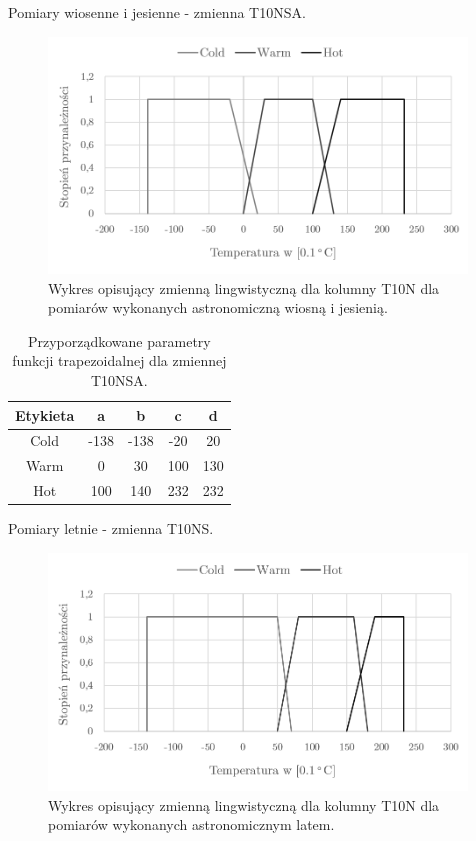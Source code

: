 \documentclass{classrep}
\begin{document}
Pomiary wiosenne i jesienne - zmienna T10NSA.
\begin{figure}[H]
	\centering
	\includegraphics[width=0.99\textwidth]{Pictures/TermsCharts/T10_WJ.png}
	\caption{Wykres opisujący zmienną lingwistyczną dla kolumny T10N dla pomiarów wykonanych astronomiczną wiosną i jesienią.}
\end{figure}

\begin{table}[H]
	\centering
	\begin{tabular}{c c c c c} 
		\hline
		\textbf{Etykieta} & \textbf{a} & \textbf{b} & \textbf{c} & \textbf{d}\\ [0.5ex] 
		\hline
		\hline 
Cold	 & -138 & -138 & -20 & 20 \\
Warm & 0 & 30 & 100 & 130 \\
Hot	 & 100 & 140 & 232 & 232 \\
		\hline
	\end{tabular}
	\caption{Przyporządkowane parametry funkcji trapezoidalnej dla zmiennej T10NSA.}
\end{table}

Pomiary letnie - zmienna T10NS.
\begin{figure}[H]
	\centering
	\includegraphics[width=0.99\textwidth]{Pictures/TermsCharts/T10_L.png}
	\caption{Wykres opisujący zmienną lingwistyczną dla kolumny T10N dla pomiarów wykonanych astronomicznym latem.}
\end{figure}
\end{document}
